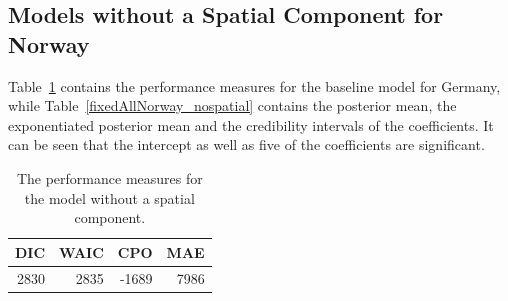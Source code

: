 \subsection{Models without a Spatial Component for Norway}\label{sec:nospatial_norway}
Table~\ref{allNorway_nospatial} contains the performance measures for the baseline model for Germany, while Table~\ref{fixedAllNorway_nospatial} contains the posterior mean, the exponentiated posterior mean and the credibility intervals of the coefficients. It can be seen that the intercept as well as five of the coefficients are significant.
\begin{table}[H] 
\caption{The performance measures for the model without a spatial component. \label{allNorway_nospatial}}
\begin{tabular}{r r r r}
\toprule\textbf{DIC}	& \textbf{WAIC} & \textbf{CPO} & \textbf{MAE}\\
\midrule
2830 & 2835 & -1689 & 7986 \\
\bottomrule
\end{tabular}
\end{table} 
